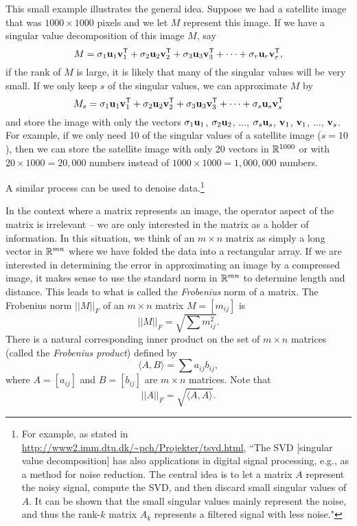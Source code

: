 This small example illustrates the general idea. Suppose we had a satellite image that was $1000 \times 1000$ pixels and we let $M$ represent this image. If we have a singular value decomposition of this image $M$, say
\[M = \sigma_1 \mathbf{u}_1\mathbf{v}_1^{\mathsf{T}} + \sigma_2 \mathbf{u}_2\mathbf{v}_2^{\mathsf{T}} + \sigma_3 \mathbf{u}_3\mathbf{v}_3^{\mathsf{T}} + \cdots + \sigma_{r} \mathbf{u}_{r}\mathbf{v}_{r}^{\mathsf{T}},\]
if the rank of $M$ is large, it is likely that many of the singular values will be very small. If we only keep $s$ of the singular values, we can approximate $M$ by
\[M_s = \sigma_1 \mathbf{u}_1\mathbf{v}_1^{\mathsf{T}} + \sigma_2 \mathbf{u}_2\mathbf{v}_2^{\mathsf{T}} + \sigma_3 \mathbf{u}_3\mathbf{v}_3^{\mathsf{T}} + \cdots + \sigma_{s} \mathbf{u}_{s}\mathbf{v}_{s}^{\mathsf{T}}\]
and store the image with only the vectors $\sigma_1 \mathbf{u}_1$, $\sigma_2 \mathbf{u}_2$, $\ldots$, $\sigma_{s}\mathbf{u}_s$, $\mathbf{v}_1$, $\mathbf{v}_1$, $\ldots$, $\mathbf{v}_s$.
For example, if we only need 10 of the singular values of a satellite image ($s = 10$), then we can store the satellite image with only 20 vectors in $\mathbb{R}^{1000}$ or with $20 \times 1000 = 20,000$ numbers instead of $1000 \times 1000 = 1,000,000$ numbers.

A similar process can be used to denoise data.\footnote{For example, as stated in \url{http://www2.imm.dtu.dk/~pch/Projekter/tsvd.html}, ``The SVD [singular value decomposition] has also applications in digital signal processing, e.g., as a method for noise reduction. The central idea is to let a matrix $A$ represent the noisy signal, compute the SVD, and then discard small singular values of $A$. It can be shown that the small singular values mainly represent the noise, and thus the rank-$k$ matrix $A_k$ represents a filtered signal with less noise."}

\label{sec:err_approx_img}

In the context where a matrix represents an image, the operator aspect of the matrix is irrelevant -- we are only interested in the matrix as a holder of information. In this situation, we think of an $m \times n$ matrix as simply a long vector in $\mathbb{R}^{mn}$ where we have folded the data into a rectangular array. If we are interested in determining the error in approximating an image by a compressed image, it makes sense to use the standard norm in $\mathbb{R}^{mn}$ to determine length and distance. This leads to what is called the \emph{Frobenius} norm of a matrix. The Frobenius norm $||M||_F$ of an $m \times n$ matrix $M = [m_{ij}]$ is
\[||M||_F = \sqrt{ \sum m_{ij}^2 }.\]
There is a natural corresponding inner product on the set of $m \times n$ matrices (called the \emph{Frobenius product}) defined by
\[\langle A,B \rangle = \sum a_{ij}b_{ij},\]
where $A = [a_{ij}]$ and $B = [b_{ij}]$ are $m \times n$ matrices.%
Note that
\[||A||_F = \sqrt{\langle A, A\rangle}.\]

